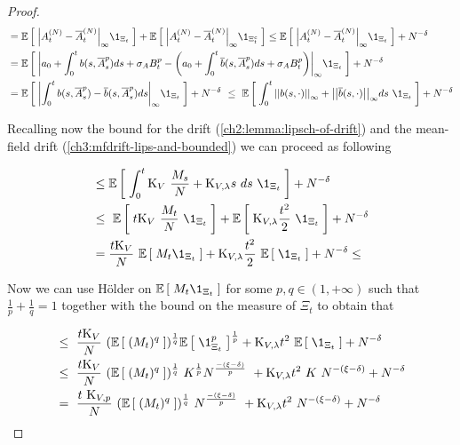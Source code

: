 \begin{proof}
	\begin{align*}
		&=
		\E{
			\normp{\infty}{
				\amba_t^{(N)} - \mfamba_t^{(N)}
			}
			\1_{\Xi_t}
		}
		+
		\E{
			\normp{\infty}{
				\amba_t^{(N)} - \mfamba_t^{(N)}
			}
			\1_{\Xi_t^c}
		}
		\leq		
		\E{
			\normp{\infty}{
				\amba_t^{(N)} - \mfamba_t^{(N)}
			}
			\1_{\Xi_t}
		} 
		+ 
		N^{-\cutparameter}
		\\
		&=
		\E{
			\normp{\infty}{
				\adens_0 + \int_0^t \drift(s, \mfamba_s^p) ds + \diffusion_\amba B_t^p
				-
				\left(
				\adens_0
				+ \int_0^t \mfdrift(s, \mfamba_s^p) d s
				+ 
				\diffusion_\amba B_t^p
				\right)
			}
			\1_{\Xi_t}
		} + 
		N^{-\cutparameter}
		\\
		&=
		\E{
			\normp{\infty}{
				\int_0^t
					\drift(s, \mfamba_s^p) - \mfdrift(s, \mfamba_s^p)
				d s
			}
			\1_{\Xi_t}
		}
		+ 
		N^{-\cutparameter}\
		\leq\
		\E{
			\int_0^t 
			\Normp{\infty}{
				\drift(s, \cdot)
			}
			+
			\Normp{\infty}{
			 	\mfdrift(s, \cdot)
			}
			ds\
			\1_{\Xi_t}
		}
		+
		N^{-\cutparameter}
	\end{align*}
	
	Recalling now the bound for the drift (\ref{ch2:lemma:lipsch-of-drift}) and the mean-field drift (\ref{ch3:mfdrift-lips-and-bounded}) we can proceed as following
	
	\begin{align*}
		&\leq
			\E{
				\int_0^t 
				\const_{\attraction}\
				\frac{\hmactive_s}{N}
				+
				\const_{\attraction, \lambda} s\			
				ds\
				\1_{\Xi_t}
			}
			+
			N^{-\cutparameter}\
		\\
		&\leq\
			\E{
				t
				\const_{\attraction}\
				\frac{\hmactive_t}{N}\
				\1_{\Xi_t}
			}
			+
			\E{
				\const_{\attraction, \lambda} 
				\frac{t^2}{2}\
				\1_{\Xi_t}
			}
			+
			N^{-\cutparameter}
		\\
		&=
		\frac{t\const_{\attraction}}{N}\
		\E{
			\hmactive_t
			\1_{\Xi_t}
		}
		+
		\const_{\attraction, \lambda} 
		\frac{t^2}{2}\
		\E{
			\1_{\Xi_t}
		}
		+
		N^{-\cutparameter}
		\leq
	\end{align*}
	
	Now we can use Hölder on $ \E{
		\hmactive_t
		\1_{\Xi_t}
	}$ for some $p,q\in (1, +\infty)$ such that $\frac{1}{p} + \frac{1}{q} = 1$ together with the bound on the measure of $\Xi_t$ to obtain that
	
	\begin{align*}
		&\leq\
			\frac{t\const_{\attraction}}{N}\
			(\E{(\hmactive_t)^q})^\frac{1}{q}
				\E{
					\1_{\Xi_t}^p
				}^\frac{1}{p}
			+
			\const_{\attraction, \lambda} 
			t^2\
			\E{
				\1_{\Xi_t}
			}
			+
			N^{-\cutparameter}
			\\
		&\leq\
			\frac{t\const_{\attraction}}{N}\
			(\E{(\hmactive_t)^q})^\frac{1}{q}\
			K^\frac{1}{p}	N^\frac{-(\xi-\cutparameter)}{p}\
			+
			\const_{\attraction, \lambda} 
			t^2\
			K\
			N^{-(\xi-\cutparameter)}
			+
			N^{-\cutparameter}
		\\
		&=\
			\frac{t\
				\const_{\attraction,p}
			}{N}\
			(\E{(\hmactive_t)^q})^\frac{1}{q}\
			N^\frac{-(\xi-\cutparameter)}{p}\
			+
			\const_{\attraction, \lambda} 
			t^2\
			N^{-(\xi-\cutparameter)}
			+
			N^{-\cutparameter}
	\end{align*}
	

\end{proof}
